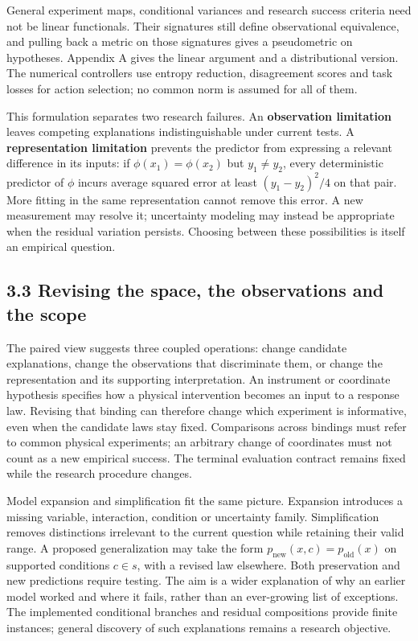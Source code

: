 \documentclass[twoside,11pt]{article}
\begin{document}
General experiment maps, conditional variances and research success criteria need not be linear functionals. Their signatures still define observational equivalence, and pulling back a metric on those signatures gives a pseudometric on hypotheses. Appendix A gives the linear argument and a distributional version. The numerical controllers use entropy reduction, disagreement scores and task losses for action selection; no common norm is assumed for all of them.


This formulation separates two research failures. An \textbf{observation limitation} leaves competing explanations indistinguishable under current tests. A \textbf{representation limitation} prevents the predictor from expressing a relevant difference in its inputs: if \(\phi(x_1)=\phi(x_2)\) but \(y_1\ne y_2\), every deterministic predictor of \(\phi\) incurs average squared error at least \((y_1-y_2)^2/4\) on that pair. More fitting in the same representation cannot remove this error. A new measurement may resolve it; uncertainty modeling may instead be appropriate when the residual variation persists. Choosing between these possibilities is itself an empirical question.


\subsection*{3.3 Revising the space, the observations and the scope}

The paired view suggests three coupled operations: change candidate explanations, change the observations that discriminate them, or change the representation and its supporting interpretation. An instrument or coordinate hypothesis specifies how a physical intervention becomes an input to a response law. Revising that binding can therefore change which experiment is informative, even when the candidate laws stay fixed. Comparisons across bindings must refer to common physical experiments; an arbitrary change of coordinates must not count as a new empirical success. The terminal evaluation contract remains fixed while the research procedure changes.


Model expansion and simplification fit the same picture. Expansion introduces a missing variable, interaction, condition or uncertainty family. Simplification removes distinctions irrelevant to the current question while retaining their valid range. A proposed generalization may take the form \(p_{\mathrm{new}}(x,c)=p_{\mathrm{old}}(x)\) on supported conditions \(c\in s\), with a revised law elsewhere. Both preservation and new predictions require testing. The aim is a wider explanation of why an earlier model worked and where it fails, rather than an ever-growing list of exceptions. The implemented conditional branches and residual compositions provide finite instances; general discovery of such explanations remains a research objective.
\end{document}
